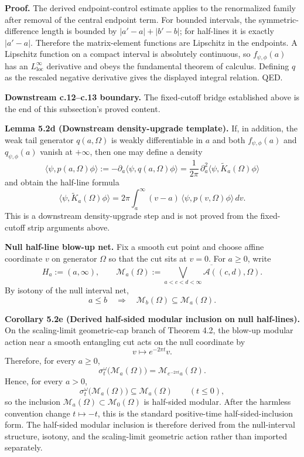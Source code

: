 \textbf{Proof.} The derived endpoint-control estimate applies to the renormalized family after removal of the central endpoint term. For bounded intervals, the symmetric-difference length is bounded by \(|a'-a|+|b'-b|\); for half-lines it is exactly \(|a'-a|\). Therefore the matrix-element functions are Lipschitz in the endpoints. A Lipschitz function on a compact interval is absolutely continuous, so \(f_{\psi,\phi}(a)\) has an \(L^\infty_{\mathrm{loc}}\) derivative and obeys the fundamental theorem of calculus. Defining \(q\) as the rescaled negative derivative gives the displayed integral relation. QED.

\textbf{Downstream c.12--c.13 boundary.} The fixed-cutoff bridge established above is the end of this subsection's proved content.

\textbf{Lemma 5.2d (Downstream density-upgrade template).} If, in addition, the weak tail generator \(q(a,\Omega)\) is weakly differentiable in \(a\) and both \(f_{\psi,\phi}(a)\) and \(q_{\psi,\phi}(a)\) vanish at \(+\infty\), then one may define a density
\[
\langle\psi,p(a,\Omega)\phi\rangle
:=
-\partial_a\langle\psi,q(a,\Omega)\phi\rangle
=
\frac{1}{2\pi}\,\partial_a^2 \langle\psi,\widetilde K_a(\Omega)\phi\rangle
\]
and obtain the half-line formula
\[
\langle\psi,\widetilde K_a(\Omega)\phi\rangle
=
2\pi\int_a^\infty (v-a)\,\langle\psi,p(v,\Omega)\phi\rangle\,dv.
\]
This is a downstream density-upgrade step and is not proved from the fixed-cutoff strip arguments above.

\textbf{Null half-line blow-up net.} Fix a smooth cut point and choose affine coordinate \(v\) on generator \(\Omega\) so that the cut sits at \(v=0\). For \(a\ge 0\), write
\[
H_a:=(a,\infty),
\qquad
\mathcal M_a(\Omega)
:=
\overline{\bigvee_{a<c<d<\infty}\mathcal A((c,d),\Omega)}.
\]
By isotony of the null interval net,
\[
a\le b
\quad\Longrightarrow\quad
\mathcal M_b(\Omega)\subseteq \mathcal M_a(\Omega).
\]

\textbf{Corollary 5.2e (Derived half-sided modular inclusion on null half-lines).} On the scaling-limit geometric-cap branch of Theorem 4.2, the blow-up modular action near a smooth entangling cut acts on the null coordinate by
\[
v\mapsto e^{-2\pi t}v.
\]
Therefore, for every \(a\ge 0\),
\[
\sigma_t^\omega\bigl(\mathcal M_a(\Omega)\bigr)
=
\mathcal M_{e^{-2\pi t}a}(\Omega).
\]
Hence, for every \(a>0\),
\[
\sigma_t^\omega\bigl(\mathcal M_a(\Omega)\bigr)\subseteq \mathcal M_a(\Omega)
\qquad (t\le 0),
\]
so the inclusion \(\mathcal M_a(\Omega)\subset \mathcal M_0(\Omega)\) is half-sided modular. After the harmless convention change \(t\mapsto -t\), this is the standard positive-time half-sided-inclusion form. The half-sided modular inclusion is therefore derived from the null-interval structure, isotony, and the scaling-limit geometric action rather than imported separately.

